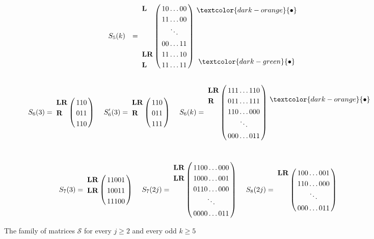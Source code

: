 \documentclass[12pt]{book}
\theoremstyle{plain}
\theoremstyle{remark}
\begin{document}
\begin{figure}[H]
{\begin{align*}
		&		
		S_5(k) &= \bordermatrix{ & \cr
		\textbf{L}& 1 0 \ldots 0 0 \cr
					  & 1 1 \ldots 0 0 \cr
					  &  \ddots \cr
					  & 0 0  \ldots 1 1 \cr
		\textbf{LR}& 1 1 \ldots 1 0 \cr
		\textbf{L}& 1 1 \ldots 1 1  }\
				\begin{matrix}
			 \textcolor{dark-orange}{\bullet} \\ \\ \\ \\ \\ \\  \textcolor{dark-green}{\bullet} \\
				\end{matrix}
		\end{align*}
		\begin{align*}
		S_6(3) &= \bordermatrix{ & \cr
		\textbf{LR} & 1 1 0 \cr
		  \textbf{R} & 0 1 1  \cr
						  & 1 1 0 }\
		&
		S_6'(3) &= \bordermatrix{ & \cr
		\textbf{LR} & 1 1 0 \cr
		  \textbf{R} & 0 1 1  \cr
						  & 1 1 1 }\
		&
		S_6(k) &= \bordermatrix{ & \cr
		\textbf{LR}& 1 1 1 \ldots 1 1 0 \cr
		  \textbf{R}& 0 1 1 \ldots 1 1 1 \cr
						& 1 1 0  \ldots 0 0 0  \cr
						&  \ddots \cr
						& 0 0 0 \ldots 0 1 1 }\
				\begin{matrix}
			\\ \\ \textcolor{dark-orange}{\bullet} \\ \\ \\ \\ \\ \\
				\end{matrix}
	\end{align*}
		\begin{align*}
		S_7(3) &= \bordermatrix{ & \cr
		\textbf{LR} & 1 1 0 0 1 \cr
		\textbf{LR} & 1 0 0 1 1  \cr
						 & 1 1 1 0 0 }\
		&
		S_7(2j) &= \bordermatrix{ & \cr
		\textbf{LR}& 1 1 0 0 \ldots 0 0 0 \cr
		\textbf{LR}& 1 0 0 0  \ldots 0 0 1 \cr
						& 0 1 1 0 \ldots 0 0 0  \cr
						&  \ddots \cr
						& 0 0 0 0 \ldots 0 1 1 }\
		&
		S_8(2j) &= \bordermatrix{ & \cr
		\textbf{LR}& 1 0 0 \ldots 0 0 1 \cr
						& 1 1 0  \ldots 0 0 0 \cr
						&  \ddots \cr
						& 0 0 0 \ldots 0 1 1 }\
	\end{align*}
		}
\caption{ The family of matrices $\mathcal{S}$ for every $j\geq2$ and every odd $k \geq 5$} \label{fig:forb_Si}
\end{figure}
\end{document}
